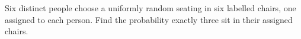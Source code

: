 Six distinct people choose a uniformly random seating in six labelled chairs, one assigned to each person. Find the probability exactly three sit in their assigned chairs.
